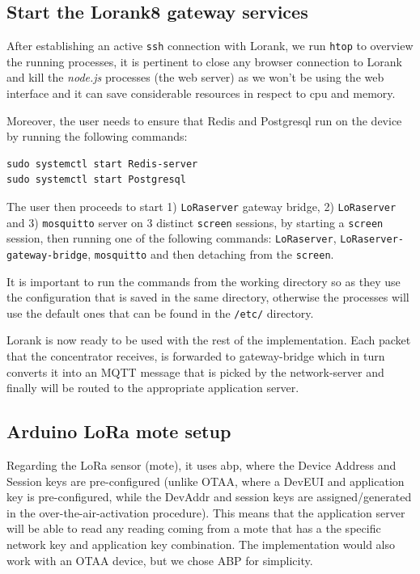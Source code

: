 \subsection{Start the Lorank8 gateway services}

After establishing an active \texttt{ssh} connection with Lorank, we run \texttt{htop} to overview the running processes, it is pertinent to close any browser connection to Lorank and kill the \textit{node.js} processes (the web server) as we won’t be using the web interface and it can save considerable resources in respect to cpu and memory.

Moreover, the user needs to ensure that Redis and Postgresql run on the device by running the following commands:

\begin{verbatim}
sudo systemctl start Redis-server
sudo systemctl start Postgresql
\end{verbatim}

The user then proceeds to start 1) \texttt{LoRaserver} gateway bridge, 2) \texttt{LoRaserver} and 3) \texttt{mosquitto} server on 3 distinct \texttt{screen} sessions, by starting a \texttt{screen} session, then running one of the following commands: \texttt{LoRaserver}, \texttt{LoRaserver-gateway-bridge}, \texttt{mosquitto} and then detaching from the \texttt{screen}. 

It is important to run the commands from the working directory so as they use the configuration that is saved in the same directory, otherwise the processes will use the default ones that can be found in the \texttt{/etc/} directory.

Lorank is now ready to be used with the rest of the implementation. Each packet that the concentrator receives, is forwarded to gateway-bridge which in turn converts it into an MQTT message that is picked by the network-server and finally will be routed to the appropriate application server.

\subsection{Arduino LoRa mote setup}

Regarding the LoRa sensor (mote), it uses \acrfull{abp}, where the Device Address and Session keys are pre-configured (unlike OTAA, where a DevEUI and application key is pre-configured, while the DevAddr and session keys are assigned/generated in the over-the-air-activation procedure). This means that the application server will be able to read any reading coming from a mote that has a the specific network key and application key combination. The implementation would also work with an OTAA device, but we chose ABP for simplicity.


